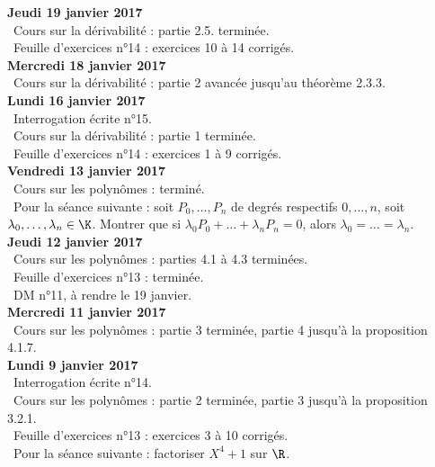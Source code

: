 \documentclass[12pt,a4paper]{article}
\begin{document}
\noindent\textbf{Jeudi 19 janvier 2017}\\
\bu\ Cours sur la dérivabilité : partie 2.5. terminée.\\
\bu\ Feuille d'exercices n°14 : exercices 10 à 14 corrigés.\vspace{.4cm}\\

\noindent\textbf{Mercredi 18 janvier 2017}\\
\bu\ Cours sur la dérivabilité : partie 2 avancée jusqu'au théorème 2.3.3.\vspace{.4cm}\\

\noindent\textbf{Lundi 16 janvier 2017}\\
\bu\ Interrogation écrite n°15.\\
\bu\ Cours sur la dérivabilité : partie 1 terminée.\\
\bu\ Feuille d'exercices n°14 : exercices 1 à 9 corrigés. \vspace{.4cm}\\

\noindent\textbf{Vendredi 13 janvier 2017}\\
\bu\ Cours sur les polynômes : terminé.\\
\bu\ Pour la séance suivante : soit $P_0,\dots,P_n$ de degrés respectifs $0,\dots,n$, soit $\lambda_0,\dots,\lambda_n \in \K$. Montrer que si $\lambda_0 P_0 + \dots + \lambda_nP_n = 0$, alors $\lambda_0 = \dots = \lambda_n$. \vspace{.4cm}\\


\noindent\textbf{Jeudi 12 janvier 2017}\\
\bu\ Cours sur les polynômes : parties 4.1 à 4.3 terminées.\\
\bu\ Feuille d'exercices n°13 : terminée.\\
\bu\ DM n°11, à rendre le 19 janvier.\vspace{.4cm}\\

\noindent\textbf{Mercredi 11 janvier 2017}\\
\bu\ Cours sur les polynômes : partie 3 terminée, partie 4 jusqu'à la proposition 4.1.7.\vspace{.4cm}\\

\noindent\textbf{Lundi 9 janvier 2017}\\
\bu\ Interrogation écrite n°14.\\
\bu\ Cours sur les polynômes : partie 2 terminée, partie 3 jusqu'à la proposition 3.2.1.\\
\bu\ Feuille d'exercices n°13 : exercices 3 à 10 corrigés.\\
\bu\ Pour la séance suivante : factoriser $X^4+1$ sur $\R$.\vspace{.4cm}\\
\end{document}
